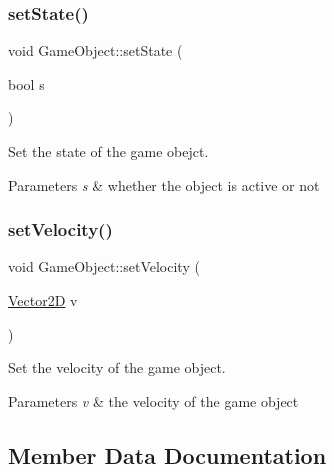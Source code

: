 \subsubsection{\texorpdfstring{set\+State()}{setState()}}
{\footnotesize\ttfamily void Game\+Object\+::set\+State (\begin{DoxyParamCaption}\item[{bool}]{s }\end{DoxyParamCaption})\hspace{0.3cm}{\ttfamily [inline]}}



Set the state of the game obejct. 


\begin{DoxyParams}{Parameters}
{\em s} & whether the object is active or not \\
\hline
\end{DoxyParams}
\mbox{\label{class_game_object_a0abf4d585166c4f33c048489f61592c0}} 
\subsubsection{\texorpdfstring{set\+Velocity()}{setVelocity()}}
{\footnotesize\ttfamily void Game\+Object\+::set\+Velocity (\begin{DoxyParamCaption}\item[{\mbox{\hyperlink{struct_vector2_d}{Vector2D}}}]{v }\end{DoxyParamCaption})\hspace{0.3cm}{\ttfamily [inline]}}



Set the velocity of the game object. 


\begin{DoxyParams}{Parameters}
{\em v} & the velocity of the game object \\
\hline
\end{DoxyParams}


\subsection{Member Data Documentation}
\mbox{\label{class_game_object_a042eea8526905be5caea9386f00204fa}} 
